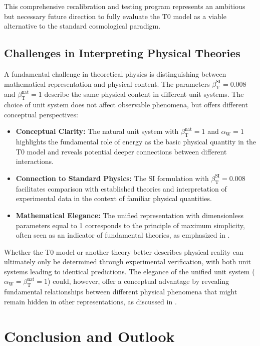 \documentclass[12pt,a4paper]{article}
\newcommand{\betaT}{\beta_{\text{T}}}
\newcommand{\alphaW}{\alpha_{\text{W}}}
\begin{document}
	This comprehensive recalibration and testing program represents an ambitious but necessary future direction to fully evaluate the T0 model as a viable alternative to the standard cosmological paradigm.
	
	\subsection{Challenges in Interpreting Physical Theories}
	\label{subsec:interpretation_challenges}
	
	A fundamental challenge in theoretical physics is distinguishing between mathematical representation and physical content. The parameters \(\betaT^{\text{SI}} = 0.008\) and \(\betaT^{\text{nat}} = 1\) describe the same physical content in different unit systems. The choice of unit system does not affect observable phenomena, but offers different conceptual perspectives:
	
	\begin{itemize}
		\item \textbf{Conceptual Clarity:} The natural unit system with \(\betaT^{\text{nat}} = 1\) and \(\alphaW = 1\) highlights the fundamental role of energy as the basic physical quantity in the T0 model and reveals potential deeper connections between different interactions.
		\item \textbf{Connection to Standard Physics:} The SI formulation with \(\betaT^{\text{SI}} = 0.008\) facilitates comparison with established theories and interpretation of experimental data in the context of familiar physical quantities.
		\item \textbf{Mathematical Elegance:} The unified representation with dimensionless parameters equal to 1 corresponds to the principle of maximum simplicity, often seen as an indicator of fundamental theories, as emphasized in \cite{pascher_zeit_masse_2025}.
	\end{itemize}
	
	Whether the T0 model or another theory better describes physical reality can ultimately only be determined through experimental verification, with both unit systems leading to identical predictions. The elegance of the unified unit system (\(\alphaW = \betaT^{\text{nat}} = 1\)) could, however, offer a conceptual advantage by revealing fundamental relationships between different physical phenomena that might remain hidden in other representations, as discussed in \cite{pascher_alphabeta_2025}.
	
	\section{Conclusion and Outlook}
	\label{sec:conclusion}
	
\end{document}
